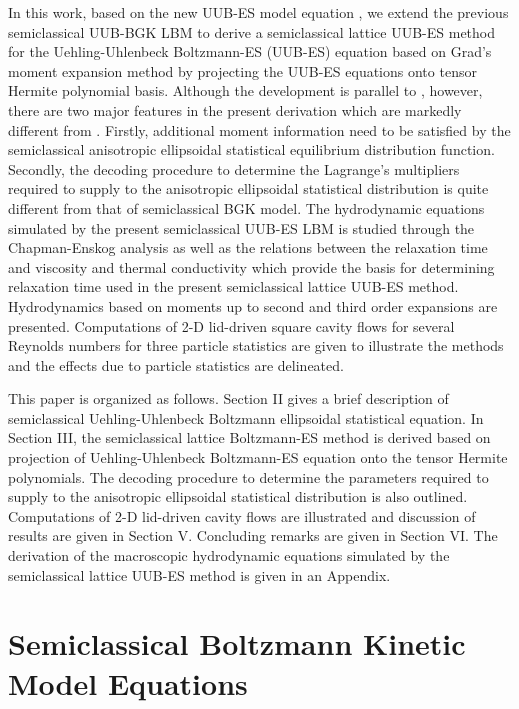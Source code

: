 \documentclass[doublecol]{epl2}
\begin{document}
In this work, based on the new UUB-ES model equation \cite{Wu2012}, we extend the previous semiclassical UUB-BGK LBM  \cite{Yang2009} to
derive a semiclassical lattice UUB-ES method for the Uehling-Uhlenbeck Boltzmann-ES (UUB-ES) equation based on Grad's moment expansion method by projecting the UUB-ES equations onto tensor Hermite polynomial basis.  Although the development is parallel to \cite{Yang2009}, however, there are two major features in the present derivation which are markedly different from \cite{Yang2009}. Firstly, additional moment information need to be satisfied by the  semiclassical anisotropic ellipsoidal statistical equilibrium distribution function. Secondly, the decoding procedure to determine the Lagrange's multipliers required to supply to the anisotropic ellipsoidal statistical distribution is quite different from that of semiclassical BGK model.  The hydrodynamic equations simulated by the present semiclassical UUB-ES LBM is studied through the Chapman-Enskog analysis as well as the relations between the relaxation time and viscosity and thermal conductivity which provide the basis for determining relaxation time used in the present semiclassical lattice UUB-ES method.  Hydrodynamics based on moments up to second and third order expansions are presented. Computations of 2-D lid-driven square cavity flows for several Reynolds numbers for three particle statistics are given to illustrate the methods and the effects due to particle statistics are delineated.

This paper is organized as follows. Section II gives a brief description of semiclassical Uehling-Uhlenbeck Boltzmann ellipsoidal statistical equation. In Section III, the semiclassical lattice Boltzmann-ES method is derived based on projection of Uehling-Uhlenbeck Boltzmann-ES equation onto the tensor Hermite polynomials. The decoding procedure to determine the parameters required to supply to the anisotropic ellipsoidal statistical distribution is also outlined. Computations of 2-D lid-driven cavity flows are illustrated and discussion of results are given in Section V.  Concluding remarks are given in Section VI. The derivation of the macroscopic hydrodynamic equations simulated by the semiclassical lattice UUB-ES method is given in an Appendix.

\section{Semiclassical Boltzmann Kinetic Model Equations}
\end{document}
